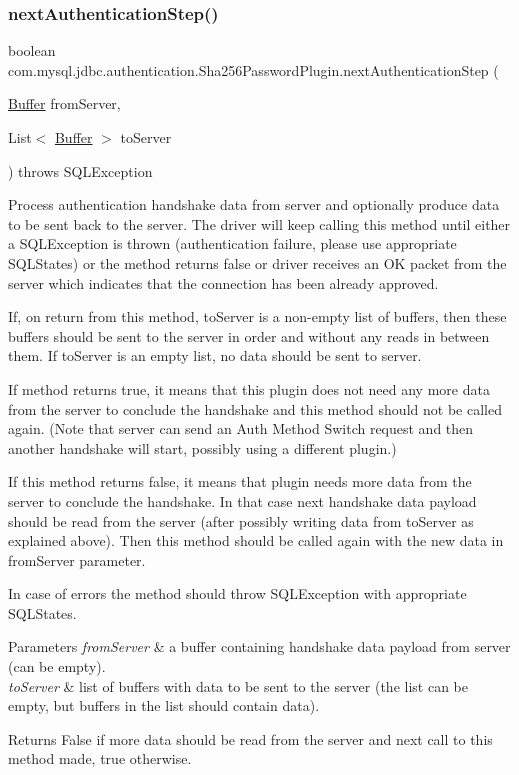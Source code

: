 \subsubsection{\texorpdfstring{next\+Authentication\+Step()}{nextAuthenticationStep()}}
{\footnotesize\ttfamily boolean com.\+mysql.\+jdbc.\+authentication.\+Sha256\+Password\+Plugin.\+next\+Authentication\+Step (\begin{DoxyParamCaption}\item[{\mbox{\hyperlink{classcom_1_1mysql_1_1jdbc_1_1_buffer}{Buffer}}}]{from\+Server,  }\item[{List$<$ \mbox{\hyperlink{classcom_1_1mysql_1_1jdbc_1_1_buffer}{Buffer}} $>$}]{to\+Server }\end{DoxyParamCaption}) throws S\+Q\+L\+Exception}

Process authentication handshake data from server and optionally produce data to be sent back to the server. The driver will keep calling this method until either a S\+Q\+L\+Exception is thrown (authentication failure, please use appropriate S\+Q\+L\+States) or the method returns false or driver receives an OK packet from the server which indicates that the connection has been already approved.

If, on return from this method, to\+Server is a non-\/empty list of buffers, then these buffers should be sent to the server in order and without any reads in between them. If to\+Server is an empty list, no data should be sent to server.

If method returns true, it means that this plugin does not need any more data from the server to conclude the handshake and this method should not be called again. (Note that server can send an Auth Method Switch request and then another handshake will start, possibly using a different plugin.)

If this method returns false, it means that plugin needs more data from the server to conclude the handshake. In that case next handshake data payload should be read from the server (after possibly writing data from to\+Server as explained above). Then this method should be called again with the new data in from\+Server parameter.

In case of errors the method should throw S\+Q\+L\+Exception with appropriate S\+Q\+L\+States.


\begin{DoxyParams}{Parameters}
{\em from\+Server} & a buffer containing handshake data payload from server (can be empty). \\
\hline
{\em to\+Server} & list of buffers with data to be sent to the server (the list can be empty, but buffers in the list should contain data).\\
\hline
\end{DoxyParams}
\begin{DoxyReturn}{Returns}
False if more data should be read from the server and next call to this method made, true otherwise. 
\end{DoxyReturn}


